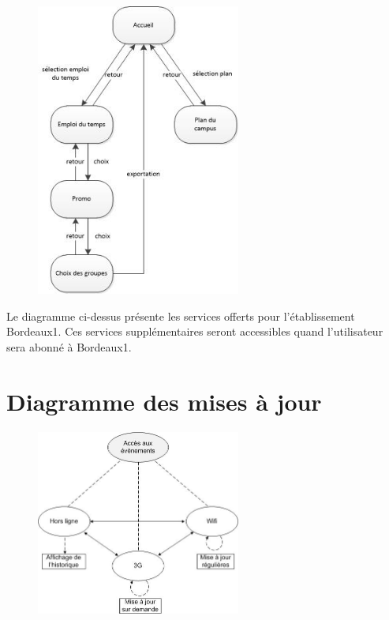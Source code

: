 \begin{figure}[h]
	\center
	\includegraphics[width=0.6\textwidth]{resources/features2.jpg}
\end{figure}

Le diagramme ci-dessus présente les services offerts pour l'établissement Bordeaux1. Ces services supplémentaires seront accessibles quand l'utilisateur sera abonné à Bordeaux1.

\section{Diagramme des mises à jour}

\begin{figure}[h]
  \center
  \includegraphics[width=0.6\textwidth]{resources/state_diagram.jpg}
\end{figure}

